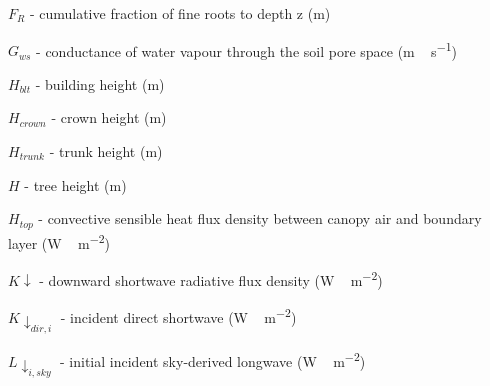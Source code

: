 {\begin{description}
\item $F_{R}$  -  cumulative fraction of fine roots to depth z (\unit{m}) 
\item $G_{ws}$  -  conductance of water vapour through the soil pore space (\unit{m\,s^{-1}}) 
\item $H _{blt}$  -  building height (\unit{m}) 
\item $H _{crown}$  -  crown height (\unit{m}) 
\item $H _{trunk}$  -  trunk height (\unit{m}) 
\item $H$    -   tree height (m)
\item $H_{top}$  -    convective sensible heat flux density between canopy air and boundary layer (\unit{W\,m^{-2}}) 
\item $K\downarrow$  -  downward shortwave radiative flux density (\unit{W\,m^{-2}}) 
\item $K\downarrow_{dir,i}$   -  incident direct shortwave (\unit{W\,m^{-2}})  
\item $L \downarrow_{i,sky}$   -   initial incident sky-derived longwave (\unit{W\,m^{-2}})  

\end{description}}
